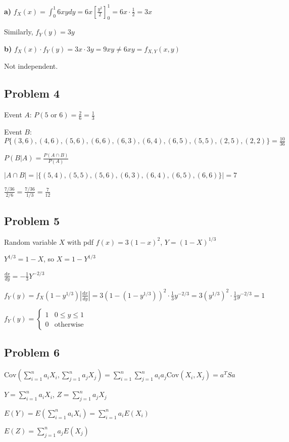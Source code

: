 \documentclass{article}
\begin{document}
\textbf{a)} $f_X(x) = \int_0^1 6xy dy = 6x \left[\frac{y^2}{2}\right]_0^1 = 6x \cdot \frac{1}{2} = 3x$

Similarly, $f_Y(y) = 3y$

\textbf{b)} $f_X(x) \cdot f_Y(y) = 3x \cdot 3y = 9xy \neq 6xy = f_{X,Y}(x,y)$

Not independent.

\subsection*{Problem 4}
Event $A$: $P(5 \text{ or } 6) = \frac{2}{6} = \frac{1}{3}$

Event $B$: $P\{(3,6), (4,6), (5,6), (6,6), (6,3), (6,4), (6,5), (5,5), (2,5), (2,2)\} = \frac{10}{36}$

$P(B|A) = \frac{P(A \cap B)}{P(A)}$

$|A \cap B| = |\{(5,4), (5,5), (5,6), (6,3), (6,4), (6,5), (6,6)\}| = 7$

$\frac{7/36}{2/6} = \frac{7/36}{1/3} = \frac{7}{12}$

\subsection*{Problem 5}
Random variable $X$ with pdf $f(x) = 3(1-x)^2$, $Y = (1-X)^{1/3}$

$Y^{1/3} = 1-X$, so $X = 1-Y^{1/3}$

$\frac{dx}{dy} = -\frac{1}{3}Y^{-2/3}$

$f_Y(y) = f_X(1-y^{1/3}) \left|\frac{dx}{dy}\right| = 3(1-(1-y^{1/3}))^2 \cdot \frac{1}{3}y^{-2/3} = 3(y^{1/3})^2 \cdot \frac{1}{3}y^{-2/3} = 1$

$f_Y(y) = \begin{cases} 1 & 0 \leq y \leq 1 \\ 0 & \text{otherwise} \end{cases}$

\subsection*{Problem 6}
$\text{Cov}\left(\sum_{i=1}^n a_i X_i, \sum_{j=1}^n a_j X_j\right) = \sum_{i=1}^n \sum_{j=1}^n a_i a_j \text{Cov}(X_i, X_j) = a^T S a$

$Y = \sum_{i=1}^n a_i X_i$, $Z = \sum_{j=1}^n a_j X_j$

$E(Y) = E\left(\sum_{i=1}^n a_i X_i\right) = \sum_{i=1}^n a_i E(X_i)$

$E(Z) = \sum_{j=1}^n a_j E(X_j)$
\end{document}
